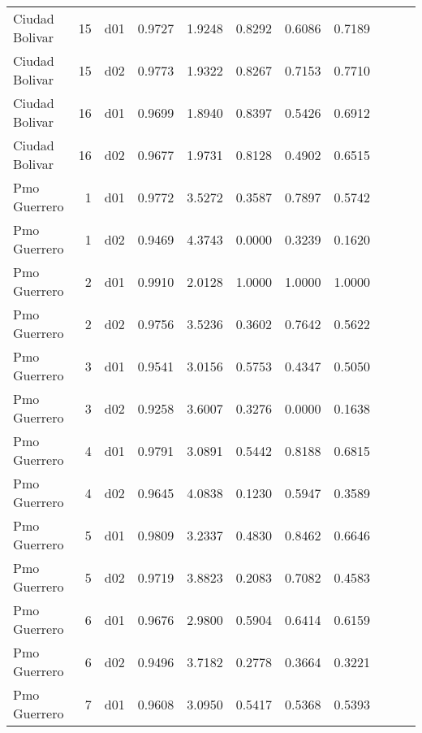 \begin{landscape}
\begin{longtable}{p{2cm}rrrrrrrrrr}
       Ciudad Bolivar  &         15 &     d01 &   0.9727 &  1.9248 &        0.8292 &           0.6086 &  0.7189 \\
       Ciudad Bolivar  &         15 &     d02 &   0.9773 &  1.9322 &        0.8267 &           0.7153 &  0.7710 \\
       Ciudad Bolivar  &         16 &     d01 &   0.9699 &  1.8940 &        0.8397 &           0.5426 &  0.6912 \\
       Ciudad Bolivar  &         16 &     d02 &   0.9677 &  1.9731 &        0.8128 &           0.4902 &  0.6515 \\
         Pmo Guerrero  &          1 &     d01 &   0.9772 &  3.5272 &        0.3587 &           0.7897 &  0.5742 \\
         Pmo Guerrero  &          1 &     d02 &   0.9469 &  4.3743 &        0.0000 &           0.3239 &  0.1620 \\
         Pmo Guerrero  &          2 &     d01 &   0.9910 &  2.0128 &        1.0000 &           1.0000 &  1.0000 \\
         Pmo Guerrero  &          2 &     d02 &   0.9756 &  3.5236 &        0.3602 &           0.7642 &  0.5622 \\
         Pmo Guerrero  &          3 &     d01 &   0.9541 &  3.0156 &        0.5753 &           0.4347 &  0.5050 \\
         Pmo Guerrero  &          3 &     d02 &   0.9258 &  3.6007 &        0.3276 &           0.0000 &  0.1638 \\
         Pmo Guerrero  &          4 &     d01 &   0.9791 &  3.0891 &        0.5442 &           0.8188 &  0.6815 \\
         Pmo Guerrero  &          4 &     d02 &   0.9645 &  4.0838 &        0.1230 &           0.5947 &  0.3589 \\
         Pmo Guerrero  &          5 &     d01 &   0.9809 &  3.2337 &        0.4830 &           0.8462 &  0.6646 \\
         Pmo Guerrero  &          5 &     d02 &   0.9719 &  3.8823 &        0.2083 &           0.7082 &  0.4583 \\
         Pmo Guerrero  &          6 &     d01 &   0.9676 &  2.9800 &        0.5904 &           0.6414 &  0.6159 \\
         Pmo Guerrero  &          6 &     d02 &   0.9496 &  3.7182 &        0.2778 &           0.3664 &  0.3221 \\
         Pmo Guerrero  &          7 &     d01 &   0.9608 &  3.0950 &        0.5417 &           0.5368 &  0.5393 \\

\end{longtable}
\end{landscape}
